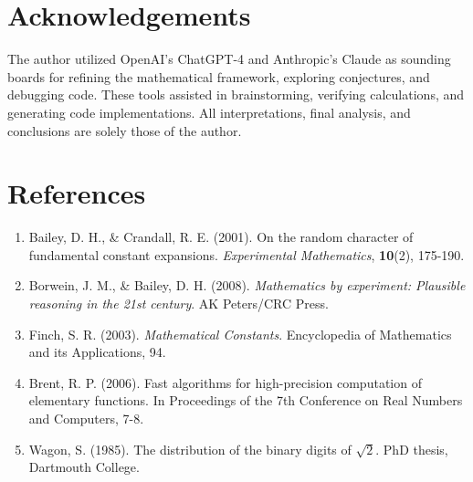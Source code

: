 \section*{Acknowledgements}
The author utilized OpenAI’s ChatGPT-4 and Anthropic’s Claude as sounding boards for
refining the mathematical framework, exploring conjectures, and debugging code. These
tools assisted in brainstorming, verifying calculations, and generating code implementations.
All interpretations, final analysis, and conclusions are solely those of the author.

\section*{References}
\begin{enumerate}
    \item Bailey, D. H., \& Crandall, R. E. (2001). On the random character of fundamental
    constant expansions. \textit{Experimental Mathematics}, \textbf{10}(2), 175-190.
    \item Borwein, J. M., \& Bailey, D. H. (2008). \textit{Mathematics by experiment: Plausible reasoning
    in the 21st century}. AK Peters/CRC Press.
    \item Finch, S. R. (2003). \textit{Mathematical Constants}. Encyclopedia of Mathematics and its
    Applications, 94.
    \item Brent, R. P. (2006). Fast algorithms for high-precision computation of elementary functions.
    In Proceedings of the 7th Conference on Real Numbers and Computers, 7-8.
    \item Wagon, S. (1985). The distribution of the binary digits of $\sqrt{2}$. PhD thesis, Dartmouth
    College.
\end{enumerate}